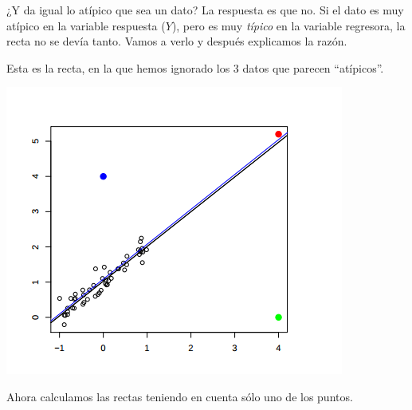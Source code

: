 \documentclass[palatino,nochap]{apuntes}
\begin{document}
\begin{example}

¿Y da igual lo atípico que sea un dato? La respuesta es que no. Si el dato es muy atípico en la variable respuesta ($Y$), pero es muy \textit{típico} en la variable regresora, la recta no se devía tanto. Vamos a verlo y después explicamos la razón.

Esta es la recta, en la que hemos ignorado los 3 datos que parecen ``atípicos''.
\begin{center}
\includegraphics[scale=0.9]{img/sobredistanciahorizontal1.png}
\end{center}

Ahora calculamos las rectas teniendo en cuenta sólo uno de los puntos.


\end{example}
\end{document}
